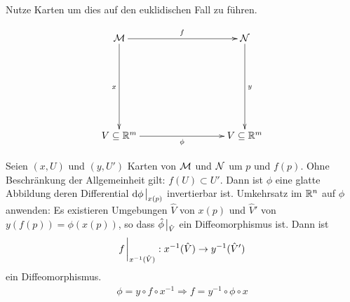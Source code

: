 \begin{bew} \leavevmode
Nutze Karten um dies auf den euklidischen Fall zu führen.

\begin{align*}
\begin{xy}
  \xymatrix@=0.25\linewidth{
      \mfk \ar[r]^f \ar[d]_x    &   \mfka \ar[d]^y \\
      V\subseteq \R^m \ar[r]_\phi             &   V\subseteq \R^m    
  }
\end{xy}
\end{align*}

Seien $(x, U)$ und $(y, U')$ Karten von $\mathcal{M}$ und $\mathcal{N}$ um $p$ und $f(p)$.
Ohne Beschränkung der Allgemeinheit gilt: $f(U) \subset U'$.
Dann ist $\phi$ eine glatte Abbildung deren Differential $\dd \phi \eval_{x(p)}$ invertierbar ist.
Umkehrsatz im $\mathbb{R}^n$ auf $\phi$ anwenden:
Es existieren Umgebungen $\hat{V}$ von $x(p)$ und $\hat{V}'$ von $y(f(p)) = \phi(x(p))$, so dass
$\hat{\phi}\eval_{\hat{V}}$ ein Diffeomorphismus ist.
Dann ist
\begin{align*}
f\eval_{x^{-1}(\hat{V})}: x^{-1}(\hat{V}) \to y^{-1}(\hat{V}')
\end{align*}
ein Diffeomorphismus.
\begin{align*}
\phi = y \circ f \circ x^{-1} \Rightarrow f = y^{-1} \circ \phi \circ x
\end{align*}
\end{bew}


